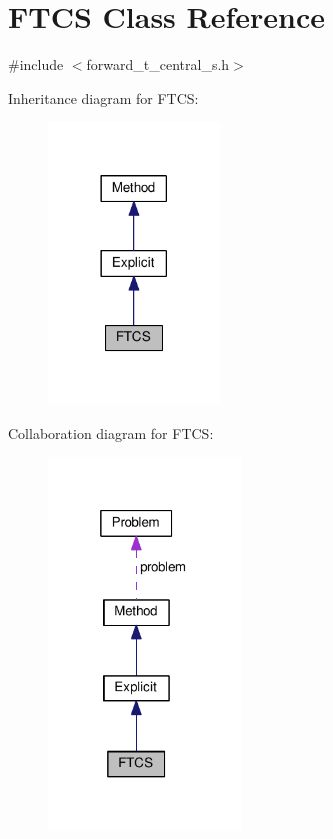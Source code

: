 \hypertarget{classFTCS}{}\section{F\+T\+CS Class Reference}
\label{classFTCS}


{\ttfamily \#include $<$forward\+\_\+t\+\_\+central\+\_\+s.\+h$>$}



Inheritance diagram for F\+T\+CS\+:
\nopagebreak
\begin{figure}[H]
\begin{center}
\leavevmode
\includegraphics[width=129pt]{classFTCS__inherit__graph}
\end{center}
\end{figure}


Collaboration diagram for F\+T\+CS\+:
\nopagebreak
\begin{figure}[H]
\begin{center}
\leavevmode
\includegraphics[width=145pt]{classFTCS__coll__graph}
\end{center}
\end{figure}
